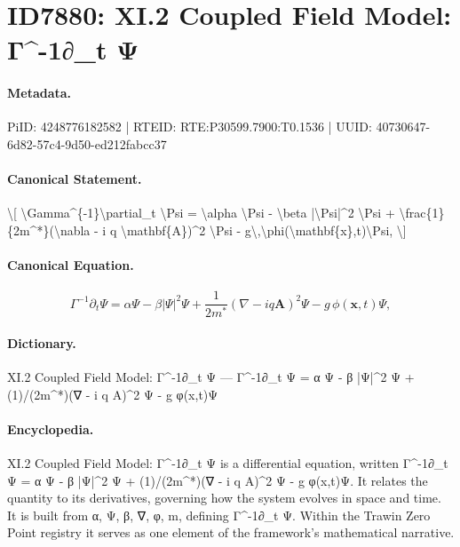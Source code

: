 \section*{ID7880: XI.2 Coupled Field Model: Γ\textasciicircum{}-1∂\_t Ψ}
\paragraph{Metadata.}
PiID: 4248776182582 | RTEID: RTE:P30599.7900:T0.1536 | UUID: 40730647-6d82-57c4-9d50-ed212fabcc37

\paragraph{Canonical Statement.}
\textbackslash{}[ \textbackslash{}Gamma\textasciicircum{}\{-1\}\textbackslash{}partial\_t \textbackslash{}Psi = \textbackslash{}alpha \textbackslash{}Psi - \textbackslash{}beta |\textbackslash{}Psi|\textasciicircum{}2 \textbackslash{}Psi + \textbackslash{}frac\{1\}\{2m\textasciicircum{}*\}(\textbackslash{}nabla - i q \textbackslash{}mathbf\{A\})\textasciicircum{}2 \textbackslash{}Psi - g\textbackslash{},\textbackslash{}phi(\textbackslash{}mathbf\{x\},t)\textbackslash{}Psi, \textbackslash{}]

\paragraph{Canonical Equation.}
\[
\Gamma^{-1}\partial_t \Psi = \alpha \Psi - \beta |\Psi|^2 \Psi + \frac{1}{2m^*}(\nabla - i q \mathbf{A})^2 \Psi - g\,\phi(\mathbf{x},t)\Psi,
\]

\paragraph{Dictionary.}
XI.2 Coupled Field Model: Γ\textasciicircum{}-1∂\_t Ψ — Γ\textasciicircum{}-1∂\_t Ψ = α Ψ - β |Ψ|\textasciicircum{}2 Ψ + (1)/(2m\textasciicircum{}*)(∇ - i q A)\textasciicircum{}2 Ψ - g φ(x,t)Ψ

\paragraph{Encyclopedia.}
XI.2 Coupled Field Model: Γ\textasciicircum{}-1∂\_t Ψ is a differential equation, written Γ\textasciicircum{}-1∂\_t Ψ = α Ψ - β |Ψ|\textasciicircum{}2 Ψ + (1)/(2m\textasciicircum{}*)(∇ - i q A)\textasciicircum{}2 Ψ - g φ(x,t)Ψ. It relates the quantity to its derivatives, governing how the system evolves in space and time. It is built from α, Ψ, β, ∇, φ, m, defining Γ\textasciicircum{}-1∂\_t Ψ. Within the Trawin Zero Point registry it serves as one element of the framework's mathematical narrative.
